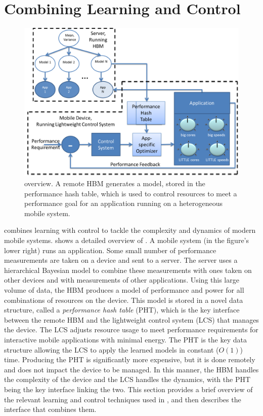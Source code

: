 \section{Combining Learning and Control}
\begin{figure}
\includegraphics[width=\columnwidth]{figures/ControlLearning.png}
\caption{\SYSTEM{} overview. A remote HBM generates a model, stored in
  the performance hash table, which is used to control resources to
  meet a performance goal for an application running on a
  heterogeneous mobile system.}
  \label{fig:overview}
\end{figure}


\SYSTEM{} combines learning with control to tackle the complexity and
dynamics of modern mobile systems.   shows a detailed
overview of \SYSTEM{}.  A mobile system (in the figure's lower right)
runs an application.  Some small number of performance measurements
are taken on a device and sent to a server.  The server uses a
hierarchical Bayesian model to combine these measurements with ones
taken on other devices and with measurements of other applications.
Using this large volume of data, the HBM produces a model of
performance and power for all combinations of resources on the device.
This model is stored in a novel data structure, called a
\emph{performance hash table} (PHT), which is the key interface
between the remote HBM and the lightweight control system (LCS) that
manages the device.  The LCS adjusts resource usage to meet
performance requirements for interactive mobile applications with
minimal energy.  The PHT is the key data structure allowing the LCS to
apply the learned models in constant ($O(1)$) time.  Producing the PHT
is significantly more expensive, but it is done remotely and does not
impact the device to be managed.  In this manner, the HBM handles the
complexity of the device and the LCS handles the dynamics, with the
PHT being the key interface linking the two.  This section provides a
brief overview of the relevant learning and control techniques used in
\SYSTEM{}, and then describes the interface that combines them.

